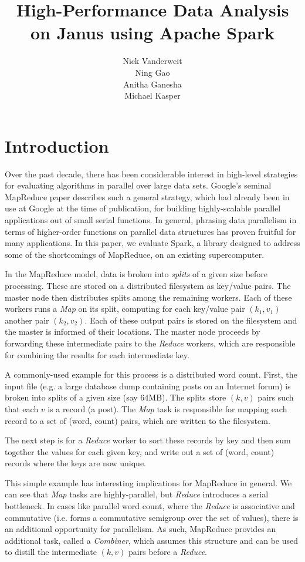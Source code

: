 \documentclass{article}
\title{High-Performance Data Analysis on Janus using Apache Spark}
\author{Nick Vanderweit \\
        Ning Gao \\
        Anitha Ganesha \\
        Michael Kasper}
\begin{document}
\maketitle

\section{Introduction}
Over the past decade, there has been considerable interest in high-level
strategies for evaluating algorithms in parallel over large data sets.
Google's seminal MapReduce paper \citep{dean-mapreduce} describes such a
general strategy, which had already been in use at Google at the time of
publication, for building highly-scalable parallel applications out of small
serial functions. In general, phrasing data parallelism in terms of
higher-order functions on parallel data structures has proven fruitful
for many applications. In this paper, we evaluate Spark, a library
designed to address some of the shortcomings of MapReduce, on an existing
supercomputer.

In the MapReduce model, data is broken into \emph{splits} of a given size
before processing. These are stored on a distributed filesystem as key/value
pairs. The master node then distributes splits among the remaining workers.
Each of these workers runs a \emph{Map} on its split, computing for each
key/value pair $(k_1, v_1)$ another pair $(k_2, v_2)$. Each of these output
pairs is stored on the filesystem and the master is informed of their
locations. The master node proceeds by forwarding these intermediate pairs to the
\emph{Reduce} workers, which are responsible for combining the results for each
intermediate key.

A commonly-used example for this process is a distributed word count. First,
the input file (e.g. a large database dump containing posts on an Internet
forum) is broken into splits of a given size (say 64MB). The splits store
$(k, v)$ pairs such that each $v$ is a record (a post). The \emph{Map} task
is responsible for mapping each record to a set of (word, count) pairs,
which are written to the filesystem.

The next step is for a \emph{Reduce} worker to sort these records by key
and then sum together the values for each given key, and write out
a set of (word, count) records where the keys are now unique.

This simple example has interesting implications for MapReduce in general.
We can see that \emph{Map} tasks are highly-parallel, but \emph{Reduce}
introduces a serial bottleneck. In cases like parallel word count, where the
\emph{Reduce} is associative and commutative (i.e. forms a commutative
semigroup over the set of values), there is an additional opportunity for
parallelism. As such, MapReduce provides an additional task, called a
\emph{Combiner}, which assumes this structure and can be used to distill
the intermediate $(k, v)$ pairs before a \emph{Reduce}.
\end{document}
